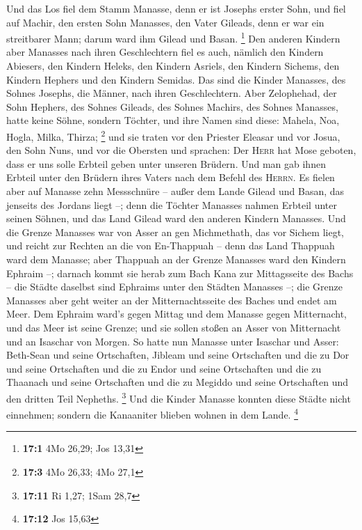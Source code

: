  Und das Los fiel dem Stamm Manasse, denn er ist Josephs
erster Sohn, und fiel auf Machir, den ersten Sohn Manasses, den Vater
Gileads, denn er war ein streitbarer Mann; darum ward ihm Gilead und
Basan. \footnote{\textbf{17:1} 4Mo 26,29; Jos 13,31}  Den
anderen Kindern aber Manasses nach ihren Geschlechtern fiel es auch,
nämlich den Kindern Abiesers, den Kindern Heleks, den Kindern Asriels,
den Kindern Sichems, den Kindern Hephers und den Kindern Semidas. Das
sind die Kinder Manasses, des Sohnes Josephs, die Männer, nach ihren
Geschlechtern.  Aber Zelophehad, der Sohn Hephers, des
Sohnes Gileads, des Sohnes Machirs, des Sohnes Manasses, hatte keine
Söhne, sondern Töchter, und ihre Namen sind diese: Mahela, Noa, Hogla,
Milka, Thirza; \footnote{\textbf{17:3} 4Mo 26,33; 4Mo 27,1}
 und sie traten vor den Priester Eleasar und vor Josua,
den Sohn Nuns, und vor die Obersten und sprachen: Der \textsc{Herr} hat
Mose geboten, dass er uns solle Erbteil geben unter unseren Brüdern. Und
man gab ihnen Erbteil unter den Brüdern ihres Vaters nach dem Befehl des
\textsc{Herrn}.  Es fielen aber auf Manasse zehn
Messschnüre -- außer dem Lande Gilead und Basan, das jenseits des
Jordans liegt --;  denn die Töchter Manasses nahmen
Erbteil unter seinen Söhnen, und das Land Gilead ward den anderen
Kindern Manasses.  Und die Grenze Manasses war von Asser
an gen Michmethath, das vor Sichem liegt, und reicht zur Rechten an die
von En-Thappuah --  denn das Land Thappuah ward dem
Manasse; aber Thappuah an der Grenze Manasses ward den Kindern Ephraim
--;  darnach kommt sie herab zum Bach Kana zur
Mittagsseite des Bachs -- die Städte daselbst sind Ephraims unter den
Städten Manasses --; die Grenze Manasses aber geht weiter an der
Mitternachtsseite des Baches und endet am Meer.  Dem
Ephraim ward's gegen Mittag und dem Manasse gegen Mitternacht, und das
Meer ist seine Grenze; und sie sollen stoßen an Asser von Mitternacht
und an Isaschar von Morgen.  So hatte nun Manasse unter
Isaschar und Asser: Beth-Sean und seine Ortschaften, Jibleam und seine
Ortschaften und die zu Dor und seine Ortschaften und die zu Endor und
seine Ortschaften und die zu Thaanach und seine Ortschaften und die zu
Megiddo und seine Ortschaften und den dritten Teil Nepheths. \footnote{\textbf{17:11}
  Ri 1,27; 1Sam 28,7}  Und die Kinder Manasse konnten
diese Städte nicht einnehmen; sondern die Kanaaniter blieben wohnen in
dem Lande. \footnote{\textbf{17:12} Jos 15,63}

